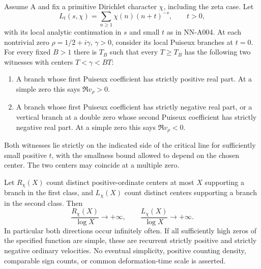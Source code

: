 \begin{theorem}
\label{thm:A039-recurrence}
Assume A and fix a primitive Dirichlet character $\chi$, including
the zeta case. Let
\[
 L_t(s,\chi)=\sum_{n\ge1}\chi(n)(n+t)^{-s},\qquad t>0,
\]
with its local analytic continuation in $s$ and small $t$ as
in NN-A004. At each nontrivial zero
$\rho=1/2+i\gamma$, $\gamma>0$, consider its local Puiseux
branches at $t=0$. For every fixed $B>1$ there is $T_B$ such
that every $T\ge T_B$ has the following two witnesses with
centers $T<\gamma<BT$:

\begin{enumerate}
\item A branch whose first Puiseux coefficient has strictly
positive real part. At a simple zero this says $\Re v_\rho>0$.
\item A branch whose first Puiseux coefficient has strictly
negative real part, or a vertical branch at a double zero whose
second Puiseux coefficient has strictly negative real part.
At a simple zero this says $\Re v_\rho<0$.
\end{enumerate}

Both witnesses lie strictly on the indicated side of the critical
line for sufficiently small positive $t$, with the smallness bound
allowed to depend on the chosen center. The two centers may
coincide at a multiple zero.

Let $R_\chi(X)$ count distinct positive-ordinate centers at most
$X$ supporting a branch in the first class, and $L_\chi(X)$
count distinct centers supporting a branch in the second class.
Then
\begin{equation}\label{eq:A039-superlog}
 \frac{R_\chi(X)}{\log X}\longrightarrow+\infty,
 \qquad\frac{L_\chi(X)}{\log X}\longrightarrow+\infty.
\end{equation}
In particular both directions occur infinitely often. If all
sufficiently high zeros of the specified function are simple,
these are recurrent strictly positive and strictly negative
ordinary velocities. No eventual simplicity, positive counting
density, comparable sign counts, or common deformation-time
scale is asserted.
\end{theorem}

